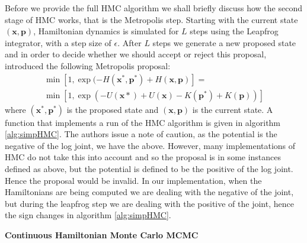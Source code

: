 \documentclass[twoside]{article}
\begin{document}
Before we provide the full HMC algorithm we shall briefly discuss how the second stage of HMC works, that is the Metropolis step. Starting with the current state $(\textbf{x},\textbf{p})$, Hamiltonian dynamics is simulated for $L$ steps using the Leapfrog integrator, with a step size of $\epsilon$. After $L$ steps we generate a new proposed state and in order to decide whether we should accept or reject this proposal, \citep{duane1987hybrid} introduced the following Metropolis proposal:
\begin{multline}
\min[1, \exp(-H(\textbf{x}^{*}, \textbf{p}^{*}) + H(\textbf{x}, \textbf{p})] =\\
\min[1, \exp(-U(\textbf{x}{*}) + U(\textbf{x}) - K(\textbf{p}^{*}) + K(\textbf{p}))]
\end{multline}where $ (\textbf{x}^{*}, \textbf{p}^{*})$ is the proposed state and $(\textbf{x}, \textbf{p})$ is the current state. A function that implements a run of the HMC algorithm is given in algorithm \ref{alg:simpHMC}. The authors issue a note of caution, as the potential is the negative of the log joint, we have the above. However, many implementations of HMC do not take this into account and so the proposal is in some instances defined as above, but the potential is defined to be the positive of the log joint. Hence the proposal would be invalid. In our implementation, when the Hamiltonians are being computed we are dealing with the negative of the joint, but during the leapfrog step we are dealing with the positive of the joint, hence the sign changes in algorithm \ref{alg:simpHMC}.  
\begin{algorithm}
	\caption{\textbf{Continuous Hamiltonian Monte Carlo MCMC}}
	\begin{algorithmic}[1]
		\EndFor
		  
		\Else
		 
		\EndIf
		\EndFor
		\EndProcedure
	\end{algorithmic}
   \label{alg:simpHMC} 
\end{algorithm}
\end{document}
